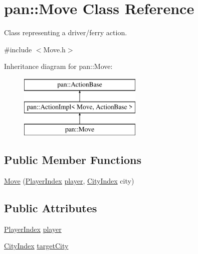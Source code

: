 \hypertarget{classpan_1_1_move}{}\section{pan\+:\+:Move Class Reference}
\label{classpan_1_1_move}


Class representing a driver/ferry action.  




{\ttfamily \#include $<$Move.\+h$>$}

Inheritance diagram for pan\+:\+:Move\+:\begin{figure}[H]
\begin{center}
\leavevmode
\includegraphics[height=3.000000cm]{classpan_1_1_move}
\end{center}
\end{figure}
\subsection*{Public Member Functions}
\begin{DoxyCompactItemize}
\item 
\hyperlink{classpan_1_1_move_a4e08c8a5412da98cef5e70b5e30d8cc5}{Move} (\hyperlink{namespacepan_a0cdabf874fbf1bb3a1f0152d108c2909}{Player\+Index} \hyperlink{classpan_1_1_move_a56c9b18c1a51462ca1bcf777e2f45bbd}{player}, \hyperlink{namespacepan_afaed28aa6603153dcc062a028602d697}{City\+Index} city)
\end{DoxyCompactItemize}
\subsection*{Public Attributes}
\begin{DoxyCompactItemize}
\item 
\hyperlink{namespacepan_a0cdabf874fbf1bb3a1f0152d108c2909}{Player\+Index} \hyperlink{classpan_1_1_move_a56c9b18c1a51462ca1bcf777e2f45bbd}{player}
\item 
\hyperlink{namespacepan_afaed28aa6603153dcc062a028602d697}{City\+Index} \hyperlink{classpan_1_1_move_a0f1d183011d04af23637005a99b50d5d}{target\+City}
\end{DoxyCompactItemize}


